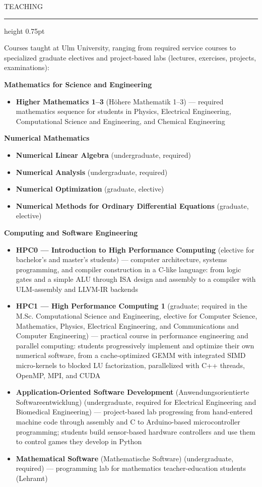 \documentclass[10pt]{article}
\newcommand{\headsize}{\fontsize{10.5pt}{12.8pt}\selectfont}  %
\newcommand{\smallsize}{\fontsize{9.5pt}{11.6pt}\selectfont}  %
\newcommand{\looser}{\linespread{1.0417}\selectfont}
\newcommand{\cvsection}[1]{%
  \par\vspace{9pt}%
  {\headsize\bfseries\color{heading}\strut#1\par}%
  \nopagebreak\vspace{1pt}%
  {\color{rule}\hrule height 0.75pt}%
  \nopagebreak\vspace{3pt}%
  \prevdepth=2.7pt\relax %
}
\newcommand{\cvlabel}[1]{%
  \par\vspace{3pt}%
  {\smallsize\bfseries #1\par}%
  \nopagebreak\vspace{1.5pt}%
}
\newcommand{\cvtext}[2][]{%
  {#1\looser #2\par}%
  \vspace{2pt}%
}
\newenvironment{cvitems}
  {\begin{itemize}[label=•, leftmargin=15pt, labelwidth=10pt, labelsep=0pt,
                   align=left, topsep=0pt, partopsep=0pt, parsep=0pt,
                   itemsep=1.5pt, beginpenalty=10000]\looser}
  {\end{itemize}\vspace{1.5pt}}
\begin{document}
\cvsection{TEACHING}

\cvtext[\smallsize]{Courses taught at Ulm University, ranging from required service courses to specialized graduate electives and project-based labs (lectures, exercises, projects, examinations):}

\cvlabel{Mathematics for Science and Engineering}

\begin{cvitems}
  \item \textbf{Higher Mathematics 1–3} (Höhere Mathematik 1–3) — required mathematics sequence for students in Physics, Electrical Engineering, Computational Science and Engineering, and Chemical Engineering
\end{cvitems}

\cvlabel{Numerical Mathematics}

\begin{cvitems}
  \item \textbf{Numerical Linear Algebra} (undergraduate, required)
  \item \textbf{Numerical Analysis} (undergraduate, required)
  \item \textbf{Numerical Optimization} (graduate, elective)
  \item \textbf{Numerical Methods for Ordinary Differential Equations} (graduate, elective)
\end{cvitems}

\cvlabel{Computing and Software Engineering}

\begin{cvitems}
  \item \textbf{HPC0 — Introduction to High Performance Computing} (elective for bachelor's and master's students) — computer architecture, systems programming, and compiler construction in a C-like language: from logic gates and a simple ALU through ISA design and assembly to a compiler with ULM-assembly and LLVM-IR backends
  \item \textbf{HPC1 — High Performance Computing 1} (graduate; required in the M.Sc. Computational Science and Engineering, elective for Computer Science, Mathematics, Physics, Electrical Engineering, and Communications and Computer Engineering) — practical course in performance engineering and parallel computing: students progressively implement and optimize their own numerical software, from a cache-optimized GEMM with integrated SIMD micro-kernels to blocked LU factorization, parallelized with C++ threads, OpenMP, MPI, and CUDA
  \item \textbf{Application-Oriented Software Development} (Anwendungsorientierte Softwareentwicklung) (undergraduate, required for Electrical Engineering and Biomedical Engineering) — project-based lab progressing from hand-entered machine code through assembly and C to Arduino-based microcontroller programming; students build sensor-based hardware controllers and use them to control games they develop in Python
  \item \textbf{Mathematical Software} (Mathematische Software) (undergraduate, required) — programming lab for mathematics teacher-education students (Lehramt)
\end{cvitems}
\end{document}
